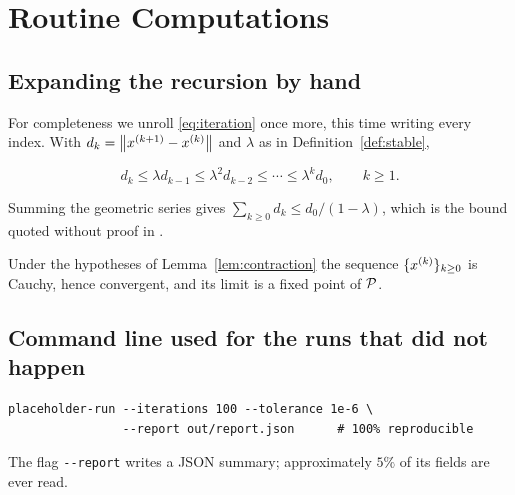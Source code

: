 \section{Routine Computations}
\label{app:details}

\subsection{Expanding the recursion by hand}
\label{app:expand}

For completeness we unroll \eqref{eq:iteration} once more, this time writing
every index.  With $d_{k} = \left\lVert x^{(k+1)} - x^{(k)} \right\rVert$ and $\lambda$ as in
Definition~\ref{def:stable},

\begin{equation}
  \label{eq:unrolled}
  d_{k} \le \lambda d_{k-1} \le \lambda^{2} d_{k-2} \le \cdots
        \le \lambda^{k} d_{0},
  \qquad k \ge 1 .
\end{equation}

Summing the geometric series gives
$\sum_{k \ge 0} d_{k} \le d_{0}/(1-\lambda)$, which is the bound quoted without
proof in \cite{placeholder2018}.

\begin{placeholderthm}
\label{thm:appendix}
Under the hypotheses of Lemma~\ref{lem:contraction} the sequence
$\{x^{(k)}\}_{k \ge 0}$ is Cauchy, hence convergent, and its limit is a fixed
point of $\mathcal{P}$.
\end{placeholderthm}

\subsection{Command line used for the runs that did not happen}
\label{app:cli}

\begin{verbatim}
placeholder-run --iterations 100 --tolerance 1e-6 \
                --report out/report.json      # 100% reproducible
\end{verbatim}

The flag \texttt{-{}-report} writes a JSON summary; approximately $5\%$ of its
fields are ever read.
